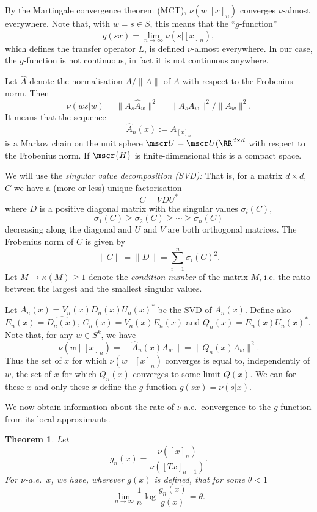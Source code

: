 \documentclass[11pt]{scrartcl}
\renewcommand{\H}{\mscr{H}}
\theoremstyle{plain} %
\newtheorem{thm}{Theorem}%
\theoremstyle{definition}
\begin{document}
By the Martingale convergence theorem (MCT), $\nu(w|[x]_n)$ 
converges $\nu$-almost everywhere. Note that, with $w=s\in S$, this
means that the ``$g$-function''
$$ g(sx) = \lim_{n\to\infty} \nu(s|[x]_n), $$ 
which defines the transfer operator $L$, is defined $\nu$-almost
everywhere. In our case, the $g$-function is not continuous, in fact
it is not continuous anywhere.

Let $\hat A$ denote the normalisation $A/\|A\|$ of $A$ with respect to
the Frobenius norm. Then 
$$\nu(ws|w) = \| A_s \hat A_w \|^2 = \| A_s A_w \|^2\big/\| A_w \|^2. $$ 
It means that the sequence 
$$\hat A_n(x) := \hat A_{[x]_n}$$ 
is a Markov chain on the unit sphere $\mscr U = \mscr
U(\RR^{d\times d}$ with respect to the Frobenius norm.
If $\H$ is finite-dimensional this is a compact space.

We will use the \emph{singular value decomposition (SVD):} That is, for a
matrix $d\times d$, $C$ we have a (more or less) unique factorisation
$$ C = V D U^*$$ 
where $D$ is a positive diagonal matrix with the singular values
$\sigma_i(C)$, 
$$ \sigma_1(C)\geq \sigma_2(C) \geq \cdots \geq \sigma_n(C) $$
decreasing along the diagonal and $U$ and $V$ are both orthogonal
matrices. The Frobenius norm of $C$ is given by 
$$ \| C \| = \| D\| = \sum_{i=1}^n \sigma_i(C)^2. $$ 
Let $M\to\kappa(M)\geq1$ denote the
\emph{condition number} of the matrix $M$, i.e. the ratio between the
largest and the smallest singular values.

Let $A_n(x)=V_n(x)D_n(x)U_n(x)^*$ be the SVD of $A_n(x)$. Define also 
$E_n(x)=\hat{D_n(x)}$, $C_n(x)=V_n(x)E_n(x)$ and
$Q_n(x)=E_n(x)U_n(x)^*$. Note that, for any $w\in S^k$, we have 
$$ \nu(w\mid [x]_n ) = \|\hat A_n(x) A_w \| = \| Q_n(x) A_w \|^2. $$
Thus the set of $x$ for which $\nu(w\mid [x]_n )$ converges is equal to,
independently of $w$, the set of $x$ for which $Q_n(x)$ converges to
some limit $Q(x)$. We can for these $x$ and only these $x$ define the
$g$-function $g(sx) = \nu(s|x)$. 

We now obtain information about the rate of $\nu$-a.e.\ convergence to the $g$-function from
its local approximants.
\begin{thm}
Let
$$g_n (x)=\frac{\nu([x]_n)}{\nu([Tx]_{n-1})}.$$
For $\nu$-a.e.\ $x$, we have, wherever $g(x)$ is defined, that for some $\theta<1$
$$\lim_{n\to \infty} \frac{1}{n} \log \frac{g_n(x)}{g(x)}=\theta.$$
\end{thm}
\end{document}
